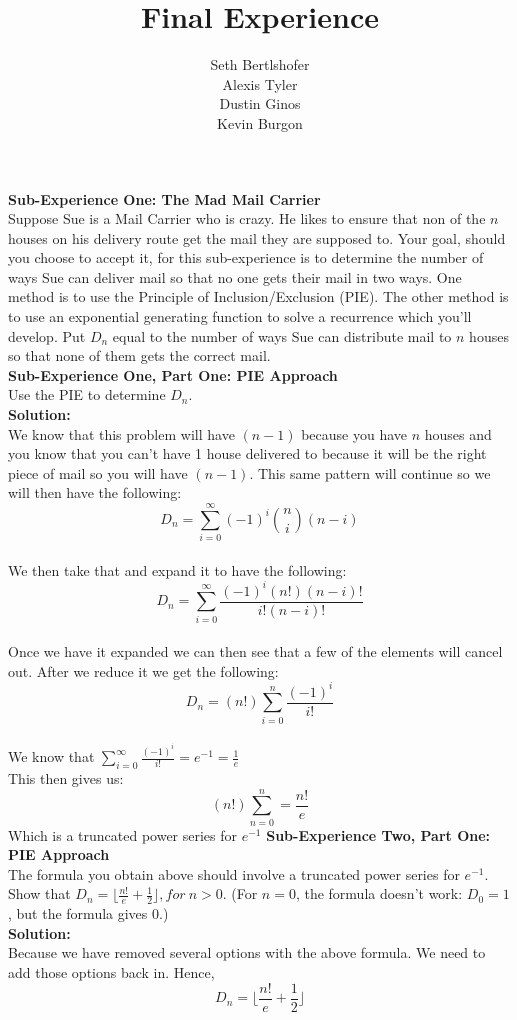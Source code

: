 \documentclass[10pt,a4paper]{report}
\author{Seth Bertlshofer\\Alexis Tyler\\Dustin Ginos\\Kevin Burgon}
\title{Final Experience}
\begin{document}
	\maketitle
	\textbf{Sub-Experience One: The Mad Mail Carrier}\\
	Suppose Sue is a Mail Carrier who is crazy.  He likes to ensure that non of the $n$ houses on his delivery route get the mail they are supposed to.  Your goal, should you choose to accept it, for this sub-experience is to determine the number of ways Sue can deliver mail so that no one gets their mail in two ways.  One method is to use the Principle of Inclusion/Exclusion (PIE).  The other method is to use an exponential generating function to solve a recurrence which you'll develop.  Put $D_n$ equal to the number of ways Sue can distribute mail to $n$ houses so that none of them gets the correct mail.\\
	
	\textbf{Sub-Experience One, Part One: PIE Approach}\\
	Use the PIE to determine $D_n$.\\
	
	\textbf{Solution: }\\
	\newline
	We know that this problem will have $(n-1)$ because you have $n$ houses and you know that you can't have 1 house delivered to because it will be the right piece of mail so you will have $(n-1)$.  This same pattern will continue so we will then have the following:\\
	\[D_n = \sum_{i=0}^{\infty} (-1)^i\binom{n}{i}(n-i)\]\\
	We then take that and expand it to have the following:\\
	\[D_n = \sum_{i=0}^{\infty}\frac{(-1)^i(n!)(n-i)!}{i!(n-i)!}\]\\
	Once we have it expanded we can then see that a few of the elements will cancel out.  After we reduce it we get the following:\\
	\[D_n = (n!)\sum_{i=0}^{n}\frac{(-1)^i}{i!}\]\\
	We know that $\sum_{i=0}^{\infty}\frac{(-1)^i}{i!} = e^{-1} = \frac{1}{e}$\\
	This then gives us:
	\[(n!)\sum_{n=0}^{n} = \frac{n!}{e}\]
	Which is a truncated power series for $e^{-1}$
	\newline
	\newline
	\textbf{Sub-Experience Two, Part One: PIE Approach}\\
	The formula you obtain above should involve a truncated power series for $e^{-1}$.  Show that $D_n = \lfloor\frac{n!}{e}+\frac{1}{2}\rfloor, for\ n > 0$. (For $n=0$, the formula doesn't work: $D_0 = 1$, but the formula gives 0.)\\
	\newline
	\textbf{Solution: }\\
	\newline
	Because we have removed several options with the above formula.  We need to add those options back in. Hence,\\
	\[D_n = \lfloor\frac{n!}{e}+\frac{1}{2}\rfloor\]
\end{document}

